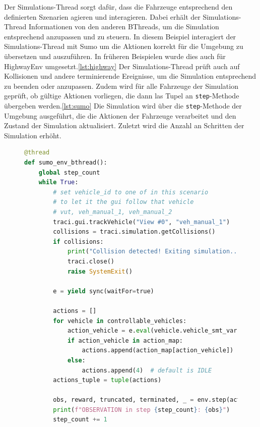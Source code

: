 Der Simulations-Thread sorgt dafür, dass die Fahrzeuge entsprechend den definierten Szenarien agieren und interagieren. Dabei erhält der Simulations-Thread Informationen von den anderen BThreads, um die Simulation entsprechend anzupassen und zu steuern.
In diesem Beispiel interagiert der Simulations-Thread mit Sumo um die Aktionen korrekt für die Umgebung zu übersetzen und auszuführen. In früheren Beispielen wurde dies auch für HighwayEnv umgesetzt.\ref{lst:highway}
Der Simulations-Thread prüft auch auf Kollisionen und andere terminierende Ereignisse, um die Simulation entsprechend zu beenden oder anzupassen. Zudem wird für alle Fahrzeuge der Simulation geprüft, ob gültige Aktionen vorliegen, die dann las Tupel an \texttt{step}-Methode übergeben werden.\ref{lst:sumo}
Die Simulation wird über die \texttt{step}-Methode der Umgebung ausgeführt, die die Aktionen der Fahrzeuge verarbeitet und den Zustand der Simulation aktualisiert. Zuletzt wird die Anzahl an Schritten der Simulation erhöht.
\begin{figure}[ht]
\begin{lstlisting}[language=Python, caption=Simulations-Thread Beispiel SumoEnv, basicstyle=\ttfamily\small, label={lst:sumo}]
@thread
def sumo_env_bthread():
    global step_count
    while True:
        # set vehicle_id to one of in this scenario
        # to let it the gui follow that vehicle
        # vut, veh_manual_1, veh_manual_2
        traci.gui.trackVehicle("View #0", "veh_manual_1")
        collisions = traci.simulation.getCollisions()
        if collisions:
            print("Collision detected! Exiting simulation...")
            traci.close()
            raise SystemExit()

        e = yield sync(waitFor=true)

        actions = []
        for vehicle in controllable_vehicles:
            action_vehicle = e.eval(vehicle.vehicle_smt_var)
            if action_vehicle in action_map:
                actions.append(action_map[action_vehicle])
            else:
                actions.append(4)  # default is IDLE
        actions_tuple = tuple(actions)

        obs, reward, truncated, terminated, _ = env.step(actions_tuple)
        print(f"OBSERVATION in step {step_count}: {obs}")
        step_count += 1
\end{lstlisting}
\end{figure}

